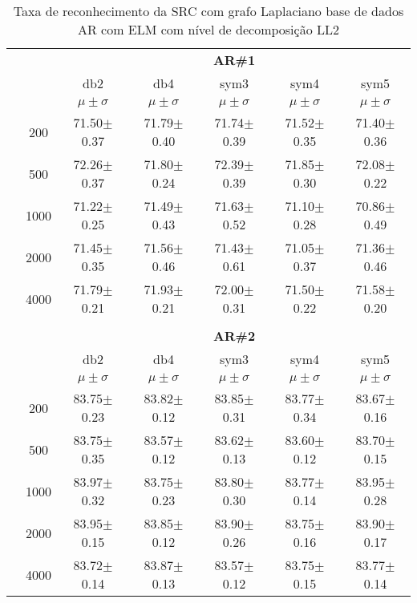 \begin{table}[H]
	\centering
    \normalsize
	\caption{Taxa de reconhecimento da SRC com grafo Laplaciano base de dados AR com ELM com nível de decomposição LL2}
		\begin{tabular}{|c|c|c c c c c|}
\cline{3-7}
\multicolumn{2}{c|}{\multirow{3}{*}{}} & \multicolumn{5}{c|}{\textbf{AR\#1}}   \\\cline{3-7} 
\multicolumn{2}{c|}{}  & db2 & db4 & sym3 & sym4 & sym5 \\\cline{3-7}%
\multicolumn{2}{c|}{}& $\mu \pm \sigma$ & $\mu \pm \sigma$ & $\mu \pm \sigma$ & $\mu \pm \sigma$ & $\mu \pm \sigma$ \\\hline
\multicolumn{1}{|c|}{ \multirow{5}{*}{\rotatebox[origin=c]{90}{\textbf{Neurônios}}} }

&200	&71.50$\pm$0.37	&71.79$\pm$0.40	&71.74$\pm$0.39	&71.52$\pm$0.35	&71.40$\pm$0.36\\\cline{2-7}
&500	&72.26$\pm$0.37	&71.80$\pm$0.24	&72.39$\pm$0.39	&71.85$\pm$0.30	&72.08$\pm$0.22\\\cline{2-7}
&1000	&71.22$\pm$0.25	&71.49$\pm$0.43	&71.63$\pm$0.52	&71.10$\pm$0.28	&70.86$\pm$0.49\\\cline{2-7}
&2000	&71.45$\pm$0.35	&71.56$\pm$0.46	&71.43$\pm$0.61	&71.05$\pm$0.37	&71.36$\pm$0.46\\\cline{2-7}
&4000	&71.79$\pm$0.21	&71.93$\pm$0.21	&72.00$\pm$0.31	&71.50$\pm$0.22	&71.58$\pm$0.20
\\ \midrule
\multicolumn{7}{c}{}\\ 


\cline{3-7}
\multicolumn{2}{c|}{\multirow{3}{*}{}} & \multicolumn{5}{c|}{\textbf{AR\#2}}   \\\cline{3-7} 
\multicolumn{2}{c|}{}  & db2 & db4 & sym3 & sym4 & sym5 \\\cline{3-7}%
\multicolumn{2}{c|}{}& $\mu \pm \sigma$ & $\mu \pm \sigma$ & $\mu \pm \sigma$ & $\mu \pm \sigma$ & $\mu \pm \sigma$ \\\hline

\multicolumn{1}{|c|}{ \multirow{5}{*}{\rotatebox[origin=c]{90}{\textbf{Neurônios}}} }
&200	&83.75$\pm$0.23	&83.82$\pm$0.12	&83.85$\pm$0.31	&83.77$\pm$0.34	&83.67$\pm$0.16\\\cline{2-7}
&500	&83.75$\pm$0.35	&83.57$\pm$0.12	&83.62$\pm$0.13	&83.60$\pm$0.12	&83.70$\pm$0.15\\\cline{2-7}
&1000	&83.97$\pm$0.32	&83.75$\pm$0.23	&83.80$\pm$0.30	&83.77$\pm$0.14	&83.95$\pm$0.28\\\cline{2-7}
&2000	&83.95$\pm$0.15	&83.85$\pm$0.12	&83.90$\pm$0.26	&83.75$\pm$0.16	&83.90$\pm$0.17\\\cline{2-7}
&4000	&83.72$\pm$0.14	&83.87$\pm$0.13	&83.57$\pm$0.12	&83.75$\pm$0.15	&83.77$\pm$0.14


\end{tabular}
\end{table}
